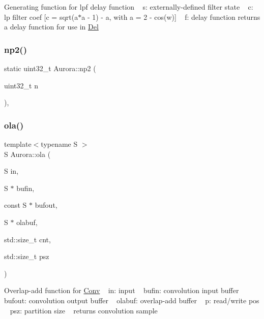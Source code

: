 Generating function for lpf delay function ~\newline
s\+: externally-\/defined filter state ~\newline
c\+: lp filter coef \mbox{[}c = sqrt(a$\ast$a -\/ 1) -\/ a, with a = 2 -\/ cos(w)\mbox{]} ~\newline
f\+: delay function returns a delay function for use in \hyperlink{class_aurora_1_1_del}{Del} \mbox{\label{namespace_aurora_a49b6f6d92479d80271ced42627154066}} 
\subsubsection{\texorpdfstring{np2()}{np2()}}
{\footnotesize\ttfamily static uint32\+\_\+t Aurora\+::np2 (\begin{DoxyParamCaption}\item[{uint32\+\_\+t}]{n }\end{DoxyParamCaption})\hspace{0.3cm}{\ttfamily [inline]}, {\ttfamily [static]}}

\mbox{\label{namespace_aurora_a8617b2b6ccb5009afc6b66c97435354f}} 
\subsubsection{\texorpdfstring{ola()}{ola()}}
{\footnotesize\ttfamily template$<$typename S $>$ \\
S Aurora\+::ola (\begin{DoxyParamCaption}\item[{S}]{in,  }\item[{S $\ast$}]{bufin,  }\item[{const S $\ast$}]{bufout,  }\item[{S $\ast$}]{olabuf,  }\item[{std\+::size\+\_\+t}]{cnt,  }\item[{std\+::size\+\_\+t}]{psz }\end{DoxyParamCaption})}

Overlap-\/add function for \hyperlink{class_aurora_1_1_conv}{Conv} ~\newline
in\+: input ~\newline
bufin\+: convolution input buffer ~\newline
bufout\+: convolution output buffer ~\newline
olabuf\+: overlap-\/add buffer ~\newline
p\+: read/write pos ~\newline
psz\+: partition size ~\newline
returns convolution sample \mbox{\label{namespace_aurora_a7ec189488ba66508d8df1c1670823365}} 
